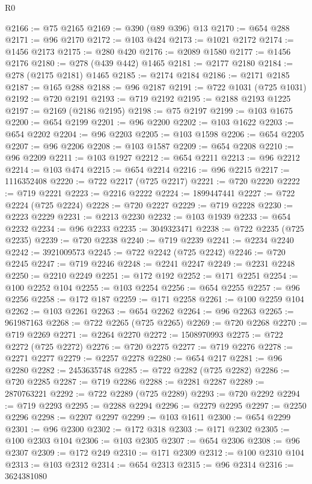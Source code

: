 \begin{lexlean}{R0}
\begin{coremodule}
@2166 := @75 @2165
@2169 := @390 (@89 @396) @13
@2170 := @654 @288
@2171 := @96 @2170
@2172 := @103 @424
@2173 := @1021 @2172
@2174 := @1456 @2173
@2175 := @280 @420
@2176 := @2089 @1580
@2177 := @1456 @2176
@2180 := @278 (@439 @442) @1465
@2181 := @2177 @2180
@2184 := @278 (@2175 @2181) @1465
@2185 := @2174 @2184
@2186 := @2171 @2185
@2187 := @165 @288
@2188 := @96 @2187
@2191 := @722 @1031 (@725 @1031)
@2192 := @720 @2191
@2193 := @719 @2192
@2195 := @2188 @2193 @1225
@2197 := @2169 (@2186 @2195)
@2198 := @75 @2197
@2199 := @103 @1675
@2200 := @654 @2199
@2201 := @96 @2200
@2202 := @103 @1622
@2203 := @654 @2202
@2204 := @96 @2203
@2205 := @103 @1598
@2206 := @654 @2205
@2207 := @96 @2206
@2208 := @103 @1587
@2209 := @654 @2208
@2210 := @96 @2209
@2211 := @103 @1927
@2212 := @654 @2211
@2213 := @96 @2212
@2214 := @103 @474
@2215 := @654 @2214
@2216 := @96 @2215
@2217 := 1116352408
@2220 := @722 @2217 (@725 @2217)
@2221 := @720 @2220
@2222 := @719 @2221
@2223 := @2216 @2222
@2224 := 1899447441
@2227 := @722 @2224 (@725 @2224)
@2228 := @720 @2227
@2229 := @719 @2228
@2230 := @2223 @2229
@2231 := @2213 @2230
@2232 := @103 @1939
@2233 := @654 @2232
@2234 := @96 @2233
@2235 := 3049323471
@2238 := @722 @2235 (@725 @2235)
@2239 := @720 @2238
@2240 := @719 @2239
@2241 := @2234 @2240
@2242 := 3921009573
@2245 := @722 @2242 (@725 @2242)
@2246 := @720 @2245
@2247 := @719 @2246
@2248 := @2241 @2247
@2249 := @2231 @2248
@2250 := @2210 @2249
@2251 := @172 @192
@2252 := @171 @2251
@2254 := @100 @2252 @104
@2255 := @103 @2254
@2256 := @654 @2255
@2257 := @96 @2256
@2258 := @172 @187
@2259 := @171 @2258
@2261 := @100 @2259 @104
@2262 := @103 @2261
@2263 := @654 @2262
@2264 := @96 @2263
@2265 := 961987163
@2268 := @722 @2265 (@725 @2265)
@2269 := @720 @2268
@2270 := @719 @2269
@2271 := @2264 @2270
@2272 := 1508970993
@2275 := @722 @2272 (@725 @2272)
@2276 := @720 @2275
@2277 := @719 @2276
@2278 := @2271 @2277
@2279 := @2257 @2278
@2280 := @654 @217
@2281 := @96 @2280
@2282 := 2453635748
@2285 := @722 @2282 (@725 @2282)
@2286 := @720 @2285
@2287 := @719 @2286
@2288 := @2281 @2287
@2289 := 2870763221
@2292 := @722 @2289 (@725 @2289)
@2293 := @720 @2292
@2294 := @719 @2293
@2295 := @2288 @2294
@2296 := @2279 @2295
@2297 := @2250 @2296
@2298 := @2207 @2297
@2299 := @103 @1611
@2300 := @654 @2299
@2301 := @96 @2300
@2302 := @172 @318
@2303 := @171 @2302
@2305 := @100 @2303 @104
@2306 := @103 @2305
@2307 := @654 @2306
@2308 := @96 @2307
@2309 := @172 @249
@2310 := @171 @2309
@2312 := @100 @2310 @104
@2313 := @103 @2312
@2314 := @654 @2313
@2315 := @96 @2314
@2316 := 3624381080

\end{coremodule}
\end{lexlean}
